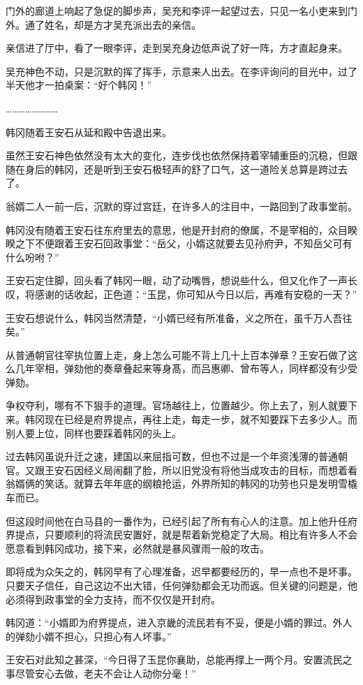 门外的廊道上响起了急促的脚步声，吴充和李评一起望过去，只见一名小吏来到门外。通了姓名，却是方才吴充派出去的亲信。

亲信进了厅中，看了一眼李评，走到吴充身边低声说了好一阵，方才直起身来。

吴充神色不动，只是沉默的挥了挥手，示意来人出去。在李评询问的目光中，过了半天他才一拍桌案：“好个韩冈！”

……………………

韩冈随着王安石从延和殿中告退出来。

虽然王安石神色依然没有太大的变化，连步伐也依然保持着宰辅重臣的沉稳，但跟随在身后的韩冈，还是听到王安石极轻声的舒了口气，这一道险关总算是跨过去了。

翁婿二人一前一后，沉默的穿过宫廷，在许多人的注目中，一路回到了政事堂前。

韩冈没有随着王安石往东府里去的意思，他是开封府的僚属，不是宰相的，众目睽睽之下不便跟着王安石回政事堂：“岳父，小婿这就要去见孙府尹，不知岳父可有什么吩咐？”

王安石定住脚，回头看了韩冈一眼，动了动嘴唇，想说些什么，但又化作了一声长叹，将感谢的话收起，正色道：“玉昆，你可知从今日以后，再难有安稳的一天？”

王安石想说什么，韩冈当然清楚，“小婿已经有所准备，义之所在，虽千万人吾往矣。”

从普通朝官往宰执位置上走，身上怎么可能不背上几十上百本弹章？王安石做了这么几年宰相，弹劾他的奏章叠起来等身髙，而吕惠卿、曾布等人，同样都没有少受弹劾。

争权夺利，哪有不下狠手的道理。官场越往上，位置越少。你上去了，别人就要下来。韩冈现在已经是府界提点，再往上走，每走一步，就不知要踩下去多少人。而别人要上位，同样也要踩着韩冈的头上。

过去韩冈虽说升迁之速，建国以来屈指可数，但也不过是一个年资浅薄的普通朝官。又跟王安石因经义局闹翻了脸，所以旧党没有将他当成攻击的目标，而想着看翁婿俩的笑话。就算去年年底的纲粮抢运，外界所知的韩冈的功劳也只是发明雪橇车而已。

但这段时间他在白马县的一番作为，已经引起了所有有心人的注意。加上他升任府界提点，只要顺利的将流民安置好，就是帮着新党稳定了大局。相比有许多人不会愿意看到韩冈成功，接下来，必然就是暴风骤雨一般的攻击。

即将成为众矢之的，韩冈早有了心理准备，迟早都要经历的，早一点也不是坏事。只要天子信任，自己这边不出大错，任何弹劾都会无功而返。但关键的问题是，他必须得到政事堂的全力支持，而不仅仅是开封府。

韩冈道：“小婿即为府界提点，进入京畿的流民若有不妥，便是小婿的罪过。外人的弹劾小婿不担心，只担心有人坏事。”

王安石对此知之甚深，“今日得了玉昆你襄助，总能再撑上一两个月。安置流民之事尽管安心去做，老夫不会让人动你分毫！”

